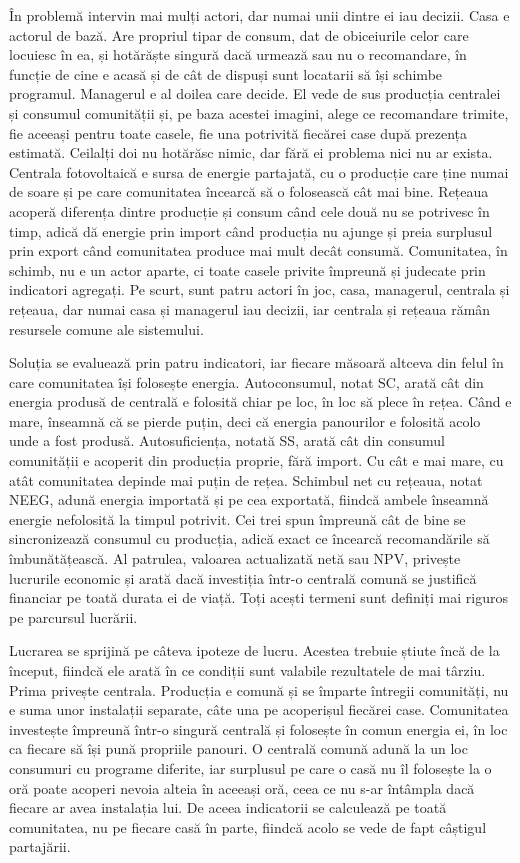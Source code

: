 \documentclass[12pt,a4paper]{report}
\begin{document}
În problemă intervin mai mulți actori, dar numai unii dintre ei iau decizii. Casa e actorul de bază. Are propriul tipar de consum, dat de obiceiurile celor care locuiesc în ea, și hotărăște singură dacă urmează sau nu o recomandare, în funcție de cine e acasă și de cât de dispuși sunt locatarii să își schimbe programul. Managerul e al doilea care decide. El vede de sus producția centralei și consumul comunității și, pe baza acestei imagini, alege ce recomandare trimite, fie aceeași pentru toate casele, fie una potrivită fiecărei case după prezența estimată. Ceilalți doi nu hotărăsc nimic, dar fără ei problema nici nu ar exista. Centrala fotovoltaică e sursa de energie partajată, cu o producție care ține numai de soare și pe care comunitatea încearcă să o folosească cât mai bine. Rețeaua acoperă diferența dintre producție și consum când cele două nu se potrivesc în timp, adică dă energie prin import când producția nu ajunge și preia surplusul prin export când comunitatea produce mai mult decât consumă. Comunitatea, în schimb, nu e un actor aparte, ci toate casele privite împreună și judecate prin indicatori agregați. Pe scurt, sunt patru actori în joc, casa, managerul, centrala și rețeaua, dar numai casa și managerul iau decizii, iar centrala și rețeaua rămân resursele comune ale sistemului.

Soluția se evaluează prin patru indicatori, iar fiecare măsoară altceva din felul în care comunitatea își folosește energia. Autoconsumul, notat SC, arată cât din energia produsă de centrală e folosită chiar pe loc, în loc să plece în rețea. Când e mare, înseamnă că se pierde puțin, deci că energia panourilor e folosită acolo unde a fost produsă. Autosuficiența, notată SS, arată cât din consumul comunității e acoperit din producția proprie, fără import. Cu cât e mai mare, cu atât comunitatea depinde mai puțin de rețea. Schimbul net cu rețeaua, notat NEEG, adună energia importată și pe cea exportată, fiindcă ambele înseamnă energie nefolosită la timpul potrivit. Cei trei spun împreună cât de bine se sincronizează consumul cu producția, adică exact ce încearcă recomandările să îmbunătățească. Al patrulea, valoarea actualizată netă sau NPV, privește lucrurile economic și arată dacă investiția într-o centrală comună se justifică financiar pe toată durata ei de viață. Toți acești termeni sunt definiți mai riguros pe parcursul lucrării.

Lucrarea se sprijină pe câteva ipoteze de lucru. Acestea trebuie știute încă de la început, fiindcă ele arată în ce condiții sunt valabile rezultatele de mai târziu. Prima privește centrala. Producția e comună și se împarte întregii comunități, nu e suma unor instalații separate, câte una pe acoperișul fiecărei case. Comunitatea investește împreună într-o singură centrală și folosește în comun energia ei, în loc ca fiecare să își pună propriile panouri. O centrală comună adună la un loc consumuri cu programe diferite, iar surplusul pe care o casă nu îl folosește la o oră poate acoperi nevoia alteia în aceeași oră, ceea ce nu s-ar întâmpla dacă fiecare ar avea instalația lui. De aceea indicatorii se calculează pe toată comunitatea, nu pe fiecare casă în parte, fiindcă acolo se vede de fapt câștigul partajării.
\end{document}
